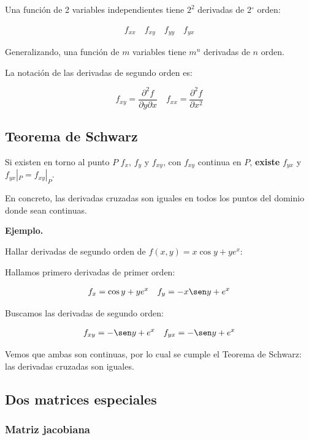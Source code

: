 Una función de 2 variables independientes tiene \(2^{2}\) 
derivadas de 2\(^{\circ}\) orden:

\begin{align*}
    f_{xx} \quad f_{xy} \quad f_{yy} \quad f_{yx}
\end{align*}

Generalizando,
una función de \(m\) variables tiene \(m^{n}\) derivadas de \(n\) orden.

La notación de las derivadas de segundo orden es:

\begin{equation*}
    f_{xy} = \frac{\partial^{2} f}{\partial y \partial x} \quad 
    f_{xx} = \frac{\partial^{2} f}{\partial x^{2}}
\end{equation*}

\subsection{Teorema de Schwarz}

Si existen en torno al punto \(P\) \(f_x\),
\(f_y\)
y \(f_{xy}\),
con \(f_{xy}\) continua en \(P\),
\textbf{existe} \(f_{yx}\) y \(f_{yx}|_P = f_{xy}|_P\).

En concreto,
las derivadas cruzadas son iguales 
en todos los puntos del dominio donde sean continuas.

\vspace{.5cm}
\textbf{Ejemplo.}

Hallar derivadas de segundo orden de \(f(x,y) = x \cos y + ye^{x}\):

Hallamos primero derivadas de primer orden:

\begin{align*}
    f_x = \cos y + ye^{x} \quad f_y = -x\sen y + e^{x}
\end{align*}

Buscamos las derivadas de segundo orden:

\begin{align*}
    f_{xy} = -\sen y + e^{x} \quad f_{yx} = -\sen y + e^{x}
\end{align*}

Vemos que ambas son continuas,
por lo cual se cumple el Teorema de Schwarz:
las derivadas cruzadas son iguales.

\subsection{Dos matrices especiales}

\subsubsection{Matriz jacobiana}

